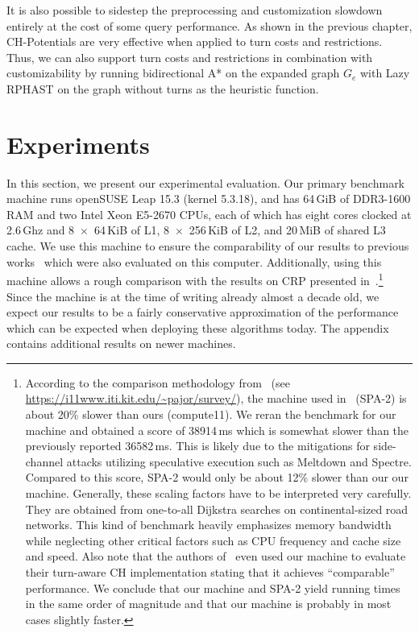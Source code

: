\documentclass[a4paper, english, cleveref]{lipics-v2021}
\begin{document}
It is also possible to sidestep the preprocessing and customization slowdown entirely at the cost of some query performance.
As shown in the previous chapter, CH-Potentials are very effective when applied to turn costs and restrictions.
Thus, we can also support turn costs and restrictions in combination with customizability by running bidirectional A* on the expanded graph $G_e$ with Lazy RPHAST on the graph without turns as the heuristic function.

\section{Experiments}
\label{sec:experiments}

In this section, we present our experimental evaluation.
Our primary benchmark machine runs openSUSE Leap 15.3 (kernel 5.3.18), and has 64\,GiB of DDR3-1600 RAM and two Intel Xeon E5-2670 CPUs, each of which has eight cores clocked at 2.6\,Ghz and 8~$\times$~64\,KiB of L1, 8~$\times$~256\,KiB of L2, and 20\,MiB of shared L3 cache.
We use this machine to ensure the comparability of our results to previous works~\cite{DibbeltSW16,BuchholdSW19} which were also evaluated on this computer.
Additionally, using this machine allows a rough comparison with the results on CRP presented in~\cite{DellingGPW17}.\footnote{
According to the comparison methodology from~\cite{BastDGMPSWW16} (see \url{https://i11www.iti.kit.edu/~pajor/survey/}), the machine used in~\cite{DellingGPW17} (SPA-2) is about 20\% slower than ours (compute11).
We reran the benchmark for our machine and obtained a score of 38914\,ms which is somewhat slower than the previously reported 36582\,ms.
This is likely due to the mitigations for side-channel attacks utilizing speculative execution such as Meltdown and Spectre.
Compared to this score, SPA-2 would only be about 12\% slower than our our machine.
Generally, these scaling factors have to be interpreted very carefully.
They are obtained from one-to-all Dijkstra searches on continental-sized road networks.
This kind of benchmark heavily emphasizes memory bandwidth while neglecting other critical factors such as CPU frequency and cache size and speed.
Also note that the authors of~\cite{DellingGPW17} even used our machine to evaluate their turn-aware CH implementation stating that it achieves ``comparable'' performance.
We conclude that our machine and SPA-2 yield running times in the same order of magnitude and that our machine is probably in most cases slightly faster.
}
Since the machine is at the time of writing already almost a decade old, we expect our results to be a fairly conservative approximation of the performance which can be expected when deploying these algorithms today.
The appendix contains additional results on newer machines.
\end{document}
